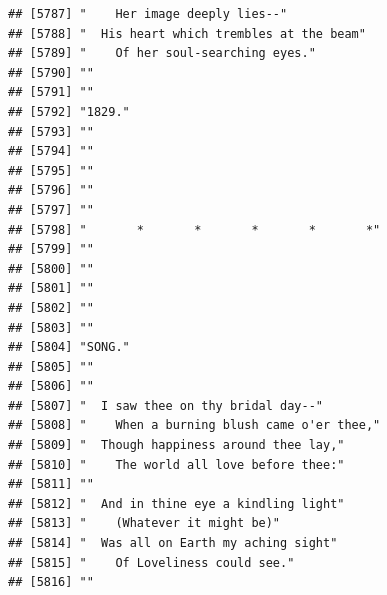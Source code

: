 \documentclass{article}\usepackage[]{graphicx}\usepackage[]{color}
\makeatletter
\newenvironment{kframe}{%
 \def\at@end@of@kframe{}%
 \ifinner\ifhmode%
  \def\at@end@of@kframe{\end{minipage}}%
  \begin{minipage}{\columnwidth}%
 \fi\fi%
 \def\FrameCommand##1{\hskip\@totalleftmargin \hskip-\fboxsep
 \colorbox{shadecolor}{##1}\hskip-\fboxsep
     \hskip-\linewidth \hskip-\@totalleftmargin \hskip\columnwidth}%
 \MakeFramed {\advance\hsize-\width
   \@totalleftmargin\z@ \linewidth\hsize
   \@setminipage}}%
 {\par\unskip\endMakeFramed%
 \at@end@of@kframe}
\newenvironment{knitrout}{}{} %
\makeatother
\begin{document}
\begin{knitrout}
\begin{kframe}
\begin{verbatim}
## [5787] "    Her image deeply lies--"                                                 
## [5788] "  His heart which trembles at the beam"                                      
## [5789] "    Of her soul-searching eyes."                                             
## [5790] ""                                                                            
## [5791] ""                                                                            
## [5792] "1829."                                                                       
## [5793] ""                                                                            
## [5794] ""                                                                            
## [5795] ""                                                                            
## [5796] ""                                                                            
## [5797] ""                                                                            
## [5798] "       *       *       *       *       *"                                    
## [5799] ""                                                                            
## [5800] ""                                                                            
## [5801] ""                                                                            
## [5802] ""                                                                            
## [5803] ""                                                                            
## [5804] "SONG."                                                                       
## [5805] ""                                                                            
## [5806] ""                                                                            
## [5807] "  I saw thee on thy bridal day--"                                            
## [5808] "    When a burning blush came o'er thee,"                                    
## [5809] "  Though happiness around thee lay,"                                         
## [5810] "    The world all love before thee:"                                         
## [5811] ""                                                                            
## [5812] "  And in thine eye a kindling light"                                         
## [5813] "    (Whatever it might be)"                                                  
## [5814] "  Was all on Earth my aching sight"                                          
## [5815] "    Of Loveliness could see."                                                
## [5816] ""                                                                            

\end{verbatim}
\end{kframe}
\end{knitrout}
\end{document}
